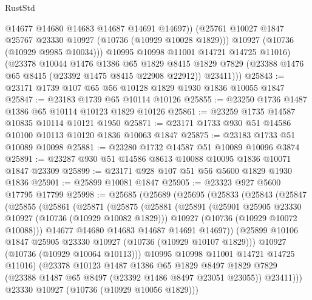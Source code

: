 \begin{lexlean}{RustStd}
\begin{coremodule}
                @14677
                @14680
                @14683
                @14687
                @14691
                @14697))
            (@25761 @10027 @1847 @25767 @23330 @10927 (@10736 (@10929 @10028 @1829)))
            @10927
            (@10736 (@10929 @9985 @10034)))
          @10995
          @10998
          @11001
          @14721
          @14725
          @11016)
        (@23378
          @10044
          @1476
          @1386
          @65
          @1829
          @8415
          @1829
          @7829
          (@23388 @1476 @65 @8415 (@23392 @1475 @8415 @22908 @22912))
          @23411)))
@25843 := @23171 @1739 @107 @65 @56 @10128 @1829 @1930 @1836 @10055 @1847
@25847 := @23183 @1739 @65 @10114 @10126
@25855 := @23250 @1736 @1487 @1386 @65 @10114 @10123 @1829 @10126
@25861 := @23259 @1735 @14587 @10835 @10114 @10121 @1950
@25871 := @23171 @1733 @930 @51 @14586 @10100 @10113 @10120 @1836 @10063 @1847
@25875 := @23183 @1733 @51 @10089 @10098
@25881 := @23280 @1732 @14587 @51 @10089 @10096 @3874
@25891 := @23287 @930 @51 @14586 @8613 @10088 @10095 @1836 @10071 @1847 @23309
@25899 := @23171 @928 @107 @51 @56 @5600 @1829 @1930 @1836
@25901 := @25899 @10081 @1847
@25905 := @23323 @927 @5600 @17795 @17799
@25998 := @25685
    (@25689
      (@25695
        (@25833
          (@25843
            (@25847
              (@25855
                (@25861
                  (@25871
                    (@25875
                      (@25881
                        (@25891
                          (@25901 @25905 @23330 @10927 (@10736 (@10929 @10082 @1829)))
                          @10927
                          (@10736 (@10929 @10072 @10088)))
                        @14677
                        @14680
                        @14683
                        @14687
                        @14691
                        @14697))
                    (@25899 @10106 @1847 @25905 @23330 @10927 (@10736 (@10929 @10107 @1829)))
                    @10927
                    (@10736 (@10929 @10064 @10113)))
                  @10995
                  @10998
                  @11001
                  @14721
                  @14725
                  @11016)
                (@23378
                  @10123
                  @1487
                  @1386
                  @65
                  @1829
                  @8497
                  @1829
                  @7829
                  (@23388 @1487 @65 @8497 (@23392 @1486 @8497 @23051 @23055))
                  @23411)))
            @23330
            @10927
            (@10736 (@10929 @10056 @1829)))

\end{coremodule}
\end{lexlean}
